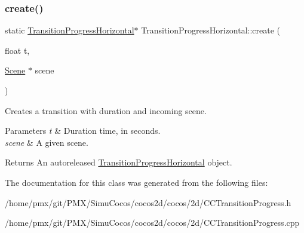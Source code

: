 \subsubsection{\texorpdfstring{create()}{create()}\hspace{0.1cm}{\footnotesize\ttfamily [2/2]}}
{\footnotesize\ttfamily static \hyperlink{classTransitionProgressHorizontal}{Transition\+Progress\+Horizontal}$\ast$ Transition\+Progress\+Horizontal\+::create (\begin{DoxyParamCaption}\item[{float}]{t,  }\item[{\hyperlink{classScene}{Scene} $\ast$}]{scene }\end{DoxyParamCaption})\hspace{0.3cm}{\ttfamily [static]}}

Creates a transition with duration and incoming scene.


\begin{DoxyParams}{Parameters}
{\em t} & Duration time, in seconds. \\
\hline
{\em scene} & A given scene. \\
\hline
\end{DoxyParams}
\begin{DoxyReturn}{Returns}
An autoreleased \hyperlink{classTransitionProgressHorizontal}{Transition\+Progress\+Horizontal} object. 
\end{DoxyReturn}


The documentation for this class was generated from the following files\+:\begin{DoxyCompactItemize}
\item 
/home/pmx/git/\+P\+M\+X/\+Simu\+Cocos/cocos2d/cocos/2d/C\+C\+Transition\+Progress.\+h\item 
/home/pmx/git/\+P\+M\+X/\+Simu\+Cocos/cocos2d/cocos/2d/C\+C\+Transition\+Progress.\+cpp\end{DoxyCompactItemize}
